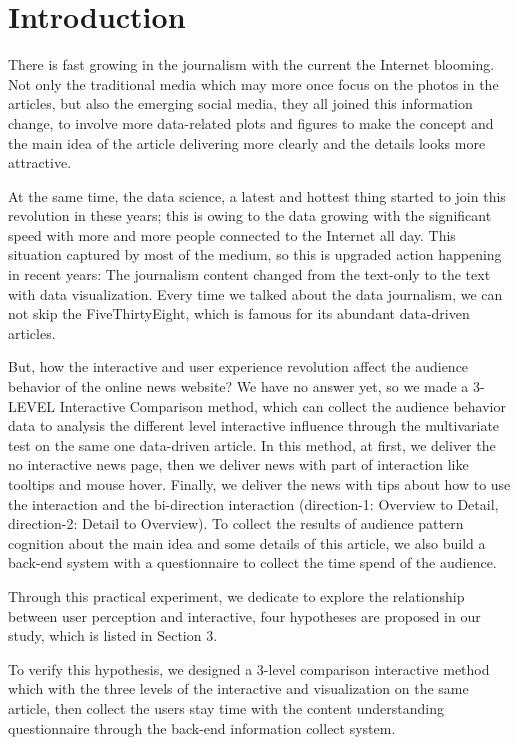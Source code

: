 \documentclass[9pt,journal,compsoc]{IEEEtran}
\begin{document}
\section{Introduction}
\large
There is fast growing in the journalism with the current the Internet blooming. Not only the traditional media which may more once focus on the photos in the articles, but also the emerging social media, they all joined this information change, to involve more data-related plots and figures to make the concept and the main idea of the article delivering more clearly and the details looks more attractive.

At the same time, the data science, a latest and hottest thing started to join this revolution in these years; this is owing to the data growing with the significant speed with more and more people connected to the Internet all day. This situation captured by most of the medium, so this is upgraded action happening in recent years: The journalism content changed from the text-only to the text with data visualization. Every time we talked about the data journalism, we can not skip the FiveThirtyEight, which is famous for its abundant data-driven articles.

But, how the interactive and user experience revolution affect the audience behavior of the online news website? We have no answer yet, so we made a 3-LEVEL Interactive Comparison method, which can collect the audience behavior data to analysis the different level interactive influence through the multivariate test on the same one data-driven article. In this method, at first, we deliver the no interactive news page, then we deliver news with part of interaction like tooltips and mouse hover. Finally, we deliver the news with tips about how to use the interaction and the bi-direction interaction (direction-1: Overview to Detail, direction-2: Detail to Overview). To collect the results of audience pattern cognition about the main idea and some details of this article, we also build a back-end system with a questionnaire to collect the time spend of the audience.

Through this practical experiment, we dedicate to explore the relationship between user perception and interactive, four hypotheses are proposed in our study, which is listed in Section 3.

 To verify this hypothesis, we designed a 3-level comparison interactive method which with the three levels of the interactive and visualization on the same article, then collect the users stay time with the content understanding questionnaire through the back-end information collect system. 
\end{document}
